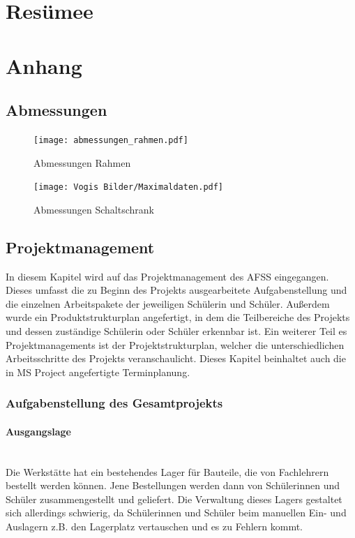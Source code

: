 
\section{Resümee}


\section{Anhang}

\subsection{Abmessungen}


\begin{figure}[H]
    \texttt{[image: abmessungen\_rahmen.pdf]}
    \centering
    \caption{Abmessungen Rahmen}
\end{figure}
\begin{figure}[H]
    \texttt{[image: Vogis Bilder/Maximaldaten.pdf]}
    \centering
    \caption{Abmessungen Schaltschrank}
\end{figure}


\subsection{Projektmanagement}
In diesem Kapitel wird auf das Projektmanagement des AFSS eingegangen. Dieses umfasst die zu Beginn des Projekts ausgearbeitete Aufgabenstellung und die einzelnen Arbeitspakete der jeweiligen Schülerin und Schüler. Außerdem wurde ein Produktstrukturplan angefertigt, in dem die Teilbereiche des Projekts und dessen zuständige Schülerin oder Schüler erkennbar ist. Ein weiterer Teil es Projektmanagements ist der Projektstrukturplan, welcher die unterschiedlichen Arbeitsschritte des Projekts veranschaulicht. Dieses Kapitel beinhaltet auch die in MS Project angefertigte Terminplanung.

\subsubsection{Aufgabenstellung des Gesamtprojekts}
\paragraph{Ausgangslage}\mbox{}\\
Die Werkstätte hat ein bestehendes Lager für Bauteile, die von Fachlehrern bestellt werden können. Jene Bestellungen werden dann von Schülerinnen und Schüler zusammengestellt und geliefert. Die Verwaltung dieses Lagers gestaltet sich allerdings schwierig, da Schülerinnen und Schüler beim manuellen Ein- und Auslagern z.B. den Lagerplatz vertauschen und es zu Fehlern kommt.

